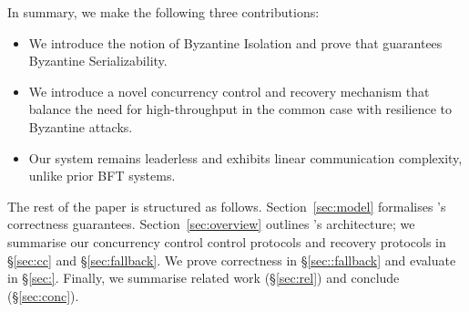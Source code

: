 In summary, we make the following three contributions: 
\begin{itemize}
\item We introduce the notion of Byzantine Isolation and prove that \sys guarantees
Byzantine Serializability.
\item We introduce a novel concurrency control and recovery mechanism that balance the need for high-throughput in
the common case with resilience to Byzantine attacks.
\item Our system remains leaderless and exhibits linear communication complexity, unlike prior BFT systems.
\end{itemize}


The rest of the paper is structured as follows. Section~\ref{sec:model} formalises \sys{}'s correctness guarantees.
Section~\ref{sec:overview} outlines
\sys's architecture; we summarise our concurrency control control protocols and recovery protocols in \S\ref{sec:cc} and \S\ref{sec:fallback}. We
prove correctness in \S\ref{sec::fallback} and evaluate \sys in \S\ref{sec:}. Finally, we summarise related work (\S\ref{sec:rel}) and conclude (\S\ref{sec:conc}).

